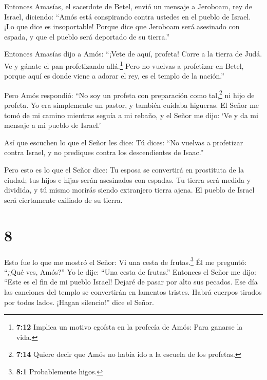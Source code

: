  Entonces Amasías, el sacerdote de Betel, envió un mensaje
a Jeroboam, rey de Israel, diciendo: ``Amós está conspirando contra
ustedes en el pueblo de Israel. ¡Lo que dice es insoportable!
 Porque dice que Jeroboam será asesinado con espada, y que
el pueblo será deportado de su tierra.''

 Entonces Amasías dijo a Amós: ``¡Vete de aquí, profeta!
Corre a la tierra de Judá. Ve y gánate el pan profetizando
allá.\footnote{\textbf{7:12} Implica un motivo egoísta en la profecía de
  Amós: Para ganarse la vida.}  Pero no vuelvas a
profetizar en Betel, porque aquí es donde viene a adorar el rey, es el
templo de la nación.''

 Pero Amós respondió: ``No soy un profeta con preparación
como tal,\footnote{\textbf{7:14} Quiere decir que Amós no había ido a la
  escuela de los profetas.} ni hijo de profeta. Yo era simplemente un
pastor, y también cuidaba higueras.  El Señor me tomó de mi
camino mientras seguía a mi rebaño, y el Señor me dijo: `Ve y da mi
mensaje a mi pueblo de Israel.'

 Así que escuchen lo que el Señor les dice: Tú dices: ``No
vuelvas a profetizar contra Israel, y no prediques contra los
descendientes de Isaac.''

 Pero esto es lo que el Señor dice: Tu esposa se convertirá
en prostituta de la ciudad; tus hijos e hijas serán asesinados con
espadas. Tu tierra será medida y dividida, y tú mismo morirás siendo
extranjero tierra ajena. El pueblo de Israel será ciertamente exiliado
de su tierra.

\hypertarget{section-7}{%
\section{8}\label{section-7}}

 Esto fue lo que me mostró el Señor: Vi una cesta de
frutas.\footnote{\textbf{8:1} Probablemente higos.}  Él me
preguntó: ``¿Qué ves, Amós?'' Yo le dije: ``Una cesta de frutas.''
Entonces el Señor me dijo: ``Este es el fin de mi pueblo Israel! Dejaré
de pasar por alto sus pecados.  Ese día las canciones del
templo se convertirán en lamentos tristes. Habrá cuerpos tirados por
todos lados. ¡Hagan silencio!'' dice el Señor.

